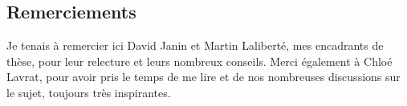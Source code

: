 \documentclass{article}
\begin{document}
\subsection{Remerciements}
Je tenais à remercier ici David Janin et Martin Laliberté, mes encadrants de thèse, pour leur relecture et leurs nombreux conseils. Merci également à Chloé Lavrat, pour avoir pris le temps de me lire et de nos nombreuses discussions sur le sujet, toujours très inspirantes.

\newpage

 

\end{document}
